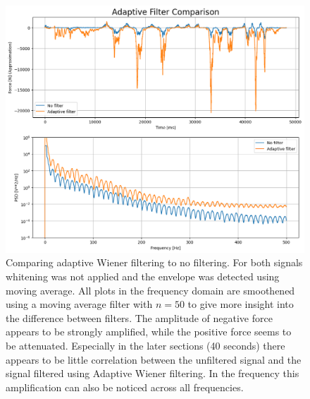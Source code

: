 \begin{figure}[h!t]
	\begin{center}
		\includegraphics[width=1.0\columnwidth]{images/measurement_adaptive_filtering.png}
	\end{center}
	\caption{Comparing adaptive Wiener filtering to no filtering. For both signals whitening was not applied and the envelope was detected using moving average. All plots in the frequency domain are smoothened using a moving average filter with $n=50$ to give more insight into the difference between filters. The amplitude of negative force appears to be strongly amplified, while the positive force seems to be attenuated. Especially in the later sections (40 seconds) there appears to be little correlation between the unfiltered signal and the signal filtered using Adaptive Wiener filtering. In the frequency this amplification can also be noticed across all frequencies.}
	\label{fig:result_adaptive_filtering}
\end{figure}

